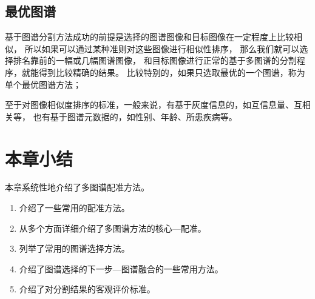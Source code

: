 \subsection{最优图谱}
基于图谱分割方法成功的前提是选择的图谱图像和目标图像在一定程度上比较相似，
所以如果可以通过某种准则对这些图像进行相似性排序，
那么我们就可以选择排名靠前的一幅或几幅图谱图像，
和目标图像进行正常的基于多图谱的分割程序，就能得到比较精确的结果。
比较特别的，如果只选取最优的一个图谱，称为单个最优图谱方法；

至于对图像相似度排序的标准，一般来说，有基于灰度信息的，如互信息量、互相关等，
也有基于图谱元数据的，如性别、年龄、所患疾病等。






\section{本章小结}
本章系统性地介绍了多图谱配准方法。
\begin{enumerate}
  \item 介绍了一些常用的配准方法。
  \item 从多个方面详细介绍了多图谱方法的核心---配准。
  \item 列举了常用的图谱选择方法。
  \item 介绍了图谱选择的下一步---图谱融合的一些常用方法。
  \item 介绍了对分割结果的客观评价标准。
\end{enumerate}

